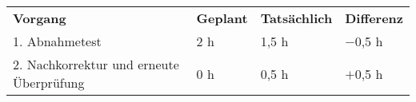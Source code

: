 \begin{tabular}{llll}
\rowcolor{heading}\textbf{Vorgang} & \textbf{Geplant} & \textbf{Tatsächlich} & \textbf{Differenz} \\
1. Abnahmetest & 2 h   & 1,5 h & $-$0,5 h \\
\rowcolor{odd}2. Nachkorrektur und erneute Überprüfung & 0 h   & 0,5 h & $+$0,5 h\\
\end{tabular}
